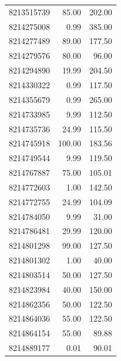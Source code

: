 \documentclass[
]{article}
\begin{document}
\begin{longtable}[]{@{}rrr@{}}
8213515739 & 85.00 & 202.00 \\
8214275008 & 0.99 & 385.00 \\
8214277489 & 89.00 & 177.50 \\
8214279576 & 80.00 & 96.00 \\
8214294890 & 19.99 & 204.50 \\
8214330322 & 0.99 & 117.50 \\
8214355679 & 0.99 & 265.00 \\
8214733985 & 9.99 & 112.50 \\
8214735736 & 24.99 & 115.50 \\
8214745918 & 100.00 & 183.56 \\
8214749544 & 9.99 & 119.50 \\
8214767887 & 75.00 & 105.01 \\
8214772603 & 1.00 & 142.50 \\
8214772755 & 24.99 & 104.09 \\
8214784050 & 9.99 & 31.00 \\
8214786481 & 29.99 & 120.00 \\
8214801298 & 99.00 & 127.50 \\
8214801302 & 1.00 & 40.00 \\
8214803514 & 50.00 & 127.50 \\
8214823984 & 40.00 & 150.00 \\
8214862356 & 50.00 & 122.50 \\
8214864036 & 55.00 & 122.50 \\
8214864154 & 55.00 & 89.88 \\
8214889177 & 0.01 & 90.01 \\
\end{longtable}
\end{document}
